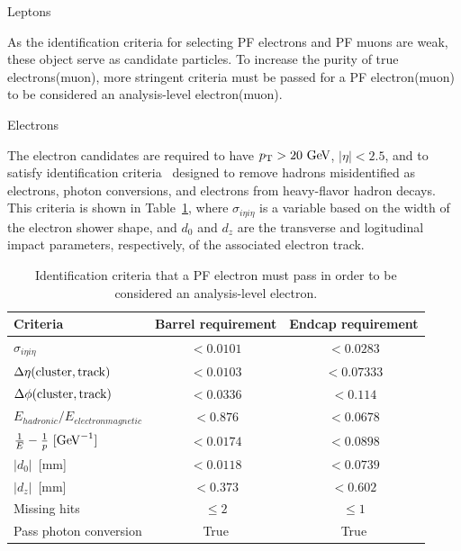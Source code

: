 \begin{section}{Leptons}

As the identification criteria for selecting PF electrons and PF muons are weak, these object serve as candidate particles. 
To increase the purity of true electrons(muon), more stringent criteria must be passed for a PF electron(muon) to be considered an analysis-level electron(muon).

\begin{subsection}{Electrons}

The electron candidates are required to have $p_\mathrm{T} > 20~\mathrm{Ge\kern -0.1em V}$, $|\eta| < 2.5$, and to satisfy identification criteria~\cite{electron_id} designed to remove hadrons misidentified as electrons, photon conversions, and electrons from heavy-flavor hadron decays. 
This criteria is shown in Table~\ref{tab:electron_id}, where $\sigma_{i\eta i\eta}$ is a variable based on the width of the electron shower shape, and $d_0$ and $d_z$ are the transverse and logitudinal impact parameters, respectively, of the associated electron track.

\begin{table}[tb!]
\centering
\begin{tabular}{l|cc}
\hline \hline
Criteria                                 &  Barrel requirement  & Endcap requirement \\
\hline
$\sigma_{i\eta i\eta}$                   &  $< 0.0101$          &  $< 0.0283 $       \\
$\Delta\eta\mathrm{(cluster,track)}$        &  $< 0.0103$          &  $< 0.07333$       \\
$\Delta\phi\mathrm{(cluster,track)}$        &  $< 0.0336$          &  $< 0.114  $       \\
$E_{hadronic}/E_{electronmagnetic}$      &  $< 0.876 $          &  $< 0.0678 $       \\
$\frac{1}{E} - \frac{1}{p}~[\mathrm{Ge\kern -0.1em V}^{-1}]$  &  $< 0.0174$          &  $< 0.0898 $       \\
$|d_0|$~[mm]                             &  $< 0.0118$          &  $< 0.0739 $       \\
$|d_z|$~[mm]                             &  $< 0.373 $          &  $< 0.602  $       \\
Missing hits                             &  $\leq 2  $          &  $\leq 1   $       \\
Pass photon conversion                   & True                 & True               \\
\hline \hline
\end{tabular}
\caption{Identification criteria that a PF electron must pass in order to be considered an analysis-level electron.}
\label{tab:electron_id}
\end{table}


\end{subsection}
\end{section}
